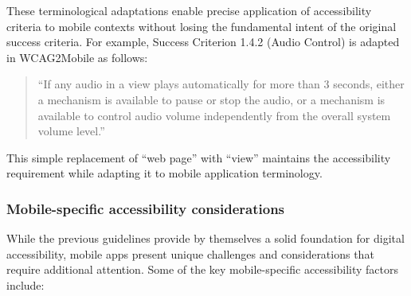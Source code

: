 These terminological adaptations enable precise application of accessibility criteria to mobile contexts without losing the fundamental intent of the original success criteria. For example, Success Criterion 1.4.2 (Audio Control) is adapted in WCAG2Mobile as follows:

\begin{quote}
``If any audio in a view plays automatically for more than 3 seconds, either a mechanism is available to pause or stop the audio, or a mechanism is available to control audio volume independently from the overall system volume level.''
\end{quote}

This simple replacement of ``web page'' with ``view'' maintains the accessibility requirement while adapting it to mobile application terminology.

\subsubsection{Mobile-specific accessibility considerations}

While the previous guidelines provide by themselves a solid foundation for digital accessibility, mobile apps present unique challenges and considerations that require additional attention. Some of the key mobile-specific accessibility factors include:


